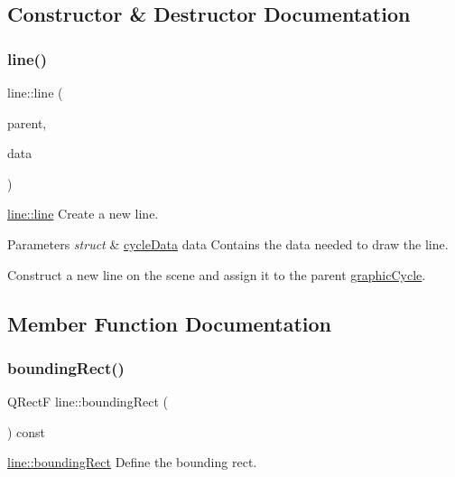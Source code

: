 \subsection{Constructor \& Destructor Documentation}
\mbox{\label{classline_a38ef6d493f122a35237517bc79653821}} 
\subsubsection{\texorpdfstring{line()}{line()}}
{\footnotesize\ttfamily line\+::line (\begin{DoxyParamCaption}\item[{\mbox{\hyperlink{classgraphic_cycle}{graphic\+Cycle}} $\ast$}]{parent,  }\item[{struct \mbox{\hyperlink{structcycle_data}{cycle\+Data}}}]{data }\end{DoxyParamCaption})}



\mbox{\hyperlink{classline_a38ef6d493f122a35237517bc79653821}{line\+::line}} Create a new line. 


\begin{DoxyParams}{Parameters}
{\em struct} & \mbox{\hyperlink{structcycle_data}{cycle\+Data}} data Contains the data needed to draw the line.\\
\hline
\end{DoxyParams}
Construct a new line on the scene and assign it to the parent \mbox{\hyperlink{classgraphic_cycle}{graphic\+Cycle}}. 

\subsection{Member Function Documentation}
\mbox{\label{classline_aecbda133a991abe5bb4080416c226e2f}} 
\subsubsection{\texorpdfstring{bounding\+Rect()}{boundingRect()}}
{\footnotesize\ttfamily Q\+RectF line\+::bounding\+Rect (\begin{DoxyParamCaption}{ }\end{DoxyParamCaption}) const}



\mbox{\hyperlink{classline_aecbda133a991abe5bb4080416c226e2f}{line\+::bounding\+Rect}} Define the bounding rect. 

